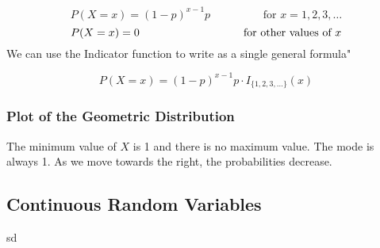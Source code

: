 $$
    P(X = x) = (1 - p)^{x-1} p \hspace{2cm} \text{for } x = 1, 2, 3, \ldots
$$
$$
    P(X = x) = 0 \hspace{3.3cm} \text{for other values of } x
$$
We can use the Indicator function to write as a single general formula"

\begin{equation}
    P(X = x) = (1 - p)^{x-1} p \cdot I_{\{1,2,3, \ldots\}}(x)
\end{equation}

\subsubsection*{Plot of the Geometric Distribution}
The minimum value of \( X \) is 1 and there is no maximum value. The mode is always 1. As we move towards the right, the probabilities decrease.


\subsection{Continuous Random Variables}
sd